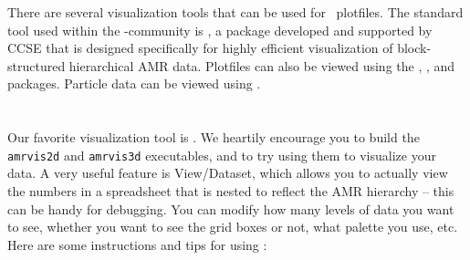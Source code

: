 There are several visualization tools that can be used for \amrex\
plotfiles.  The standard tool used within the
\amrex-community is \amrvis, a package developed and supported 
by CCSE that is designed specifically for highly efficient visualization
of block-structured hierarchical AMR data.
Plotfiles can also be viewed using the \visit, \paraview, and \yt packages.
Particle data can be viewed using \paraview.

\section{\amrvis}

Our favorite visualization tool is \amrvis. We heartily encourage you
to build the {\tt amrvis2d} and {\tt amrvis3d} executables, and to try using them
to visualize your data. A very useful feature is View/Dataset, which
allows you to actually view the numbers in a spreadsheet that is nested
to reflect the AMR hierarchy -- this can be handy for
debugging. You can modify how many levels of data you want to see,
whether you want to see the grid boxes or not, what palette you use,
etc.  Here are some instructions and tips for using \amrvis:

